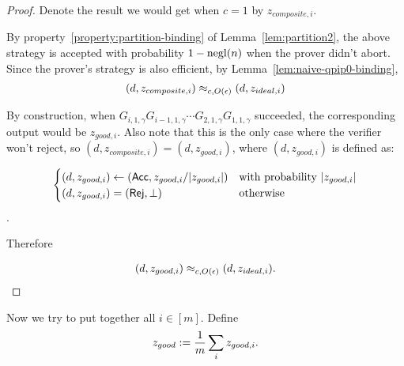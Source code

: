 \begin{proof}
	Denote the result we would get when $c=1$ by $z_{composite,i}$.

	By property~\ref{property:partition-binding} of Lemma~\ref{lem:partition2}, the above strategy is accepted with probability $1-\operatorname{negl}(n)$ when the prover didn't abort. Since the prover's strategy is also efficient, by Lemma~\ref{lem:naive-qpip0-binding},
	\begin{align}
		(d,z_{composite,i})\approx_{c, O(\epsilon)}(d,z_{ideal,i})
	\end{align}


	By construction, when $G_{i,1,\gamma}G_{i-1,1,\gamma} \cdots G_{2,1,\gamma}G_{1,1,\gamma}$ succeeded, the corresponding output would be $z_{good,i}$. Also note that this is the only case where the verifier won't reject, so $(d,z_{composite,i})=(d,z_{good,i})$, where $(d,z_{good,i})$ is defined as:

	$$\begin{cases}
		(d,z_{good,i}) \leftarrow (\mathsf{Acc}, z_{good,i}/|z_{good,i}|) & \text{with probability } |z_{good,i}|\\
						(d,z_{good,i}) = (\mathsf{Rej},\bot)  & \text{otherwise }
	\end{cases}$$.


	Therefore

	\begin{align}
		(d,z_{good,i})\approx_{c, O(\epsilon)}(d,z_{ideal,i}).
	\end{align}
\end{proof}

Now we try to put together all $i\in [m]$. Define
$$z_{good}:= \frac{1}{m}\sum_i z_{good,i}.$$

